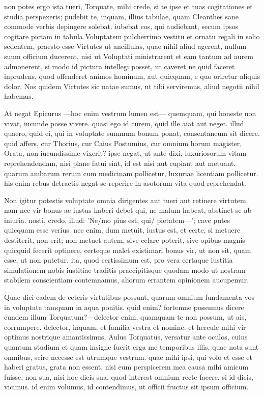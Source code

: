 non potes ergo ista tueri, Torquate, mihi crede, si te ipse et tuas cogitationes et studia perspexeris; pudebit te, inquam, illius tabulae, quam Cleanthes sane commode verbis depingere solebat. iubebat eos, qui audiebant, secum ipsos cogitare pictam in tabula Voluptatem pulcherrimo vestitu et ornatu regali in solio sedentem, praesto esse Virtutes ut ancillulas, quae nihil aliud agerent, nullum suum officium ducerent, nisi ut Voluptati ministrarent et eam tantum ad aurem admonerent, si modo id pictura intellegi posset, ut caveret ne quid faceret inprudens, quod offenderet animos hominum, aut quicquam, e quo oriretur aliquis dolor. Nos quidem Virtutes sic natae sumus, ut tibi serviremus, aliud negotii nihil habemus.

 At negat Epicurus —hoc enim vestrum lumen est— quemquam, qui honeste non vivat, iucunde posse vivere. quasi ego id curem, quid ille aiat aut neget. illud quaero, quid ei, qui in voluptate summum bonum ponat, consentaneum sit dicere. quid affers, cur Thorius, cur Caius Postumius, cur omnium horum magister, Orata, non iucundissime vixerit? ipse negat, ut ante dixi, luxuriosorum vitam reprehendendam, nisi plane fatui sint, id est nisi aut cupiant aut metuant. quarum ambarum rerum cum medicinam pollicetur, luxuriae licentiam pollicetur. his enim rebus detractis negat se reperire in asotorum vita quod reprehendat.

 Non igitur potestis voluptate omnia dirigentes aut tueri aut retinere virtutem. nam nec vir bonus ac iustus haberi debet qui, ne malum habeat, abstinet se ab iniuria. nosti, credo, illud: 'Ne/mo pius est, qui/ pietatem—'; cave putes quicquam esse verius. nec enim, dum metuit, iustus est, et certe, si metuere destiterit, non erit; non metuet autem, sive celare poterit, sive opibus magnis quicquid fecerit optinere, certeque malet existimari bonus vir, ut non sit, quam esse, ut non putetur. ita, quod certissimum est, pro vera certaque iustitia simulationem nobis iustitiae traditis praecipitisque quodam modo ut nostram stabilem conscientiam contemnamus, aliorum errantem opinionem aucupemur.

 Quae dici eadem de ceteris virtutibus possunt, quarum omnium fundamenta vos in voluptate tamquam in aqua ponitis. quid enim? fortemne possumus dicere eundem illum Torquatum?—delector enim, quamquam te non possum, ut ais, corrumpere, delector, inquam, et familia vestra et nomine. et hercule mihi vir optimus nostrique amantissimus, Aulus Torquatus, versatur ante oculos, cuius quantum studium et quam insigne fuerit erga me temporibus illis, quae nota sunt omnibus, scire necesse est utrumque vestrum. quae mihi ipsi, qui volo et esse et haberi gratus, grata non essent, nisi eum perspicerem mea causa mihi amicum fuisse, non sua, nisi hoc dicis sua, quod interest omnium recte facere. si id dicis, vicimus. id enim volumus, id contendimus, ut officii fructus sit ipsum officium.

